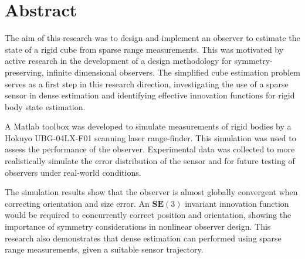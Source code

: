 \chapter*{Abstract}

The aim of this research was to design and implement an observer to estimate the state of a rigid cube from sparse range measurements. This was motivated by active research in the development of a design methodology for symmetry-preserving, infinite dimensional observers. The simplified cube estimation problem serves as a first step in this research direction, investigating the use of a sparse sensor in dense estimation and identifying effective innovation functions for rigid body state estimation. 

A Matlab toolbox was developed to simulate measurements of rigid bodies by a Hokuyo UBG-04LX-F01 scanning laser range-finder. This simulation was used to assess the performance of the observer. Experimental data was collected to more realistically simulate the error distribution of the sensor and for future testing of observers under real-world conditions. 

The simulation results show that the observer is almost globally convergent when correcting orientation and size error. An $\mathbf{SE}(3)$ invariant innovation function would be required to concurrently correct position and orientation, showing the importance of symmetry considerations in nonlinear observer design. This research also demonstrates that dense estimation can performed using sparse range measurements, given a suitable sensor trajectory. 


